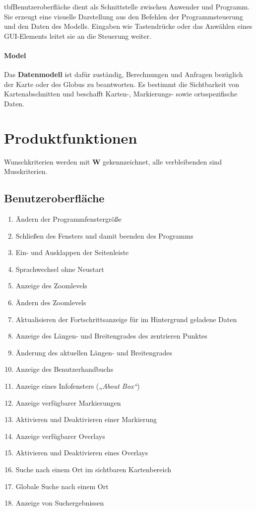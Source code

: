 \documentclass[10pt]{scrreprt}
\newcommand{\sfbf}[1]{\textbf{\sffamily #1}}
\newcommand{\W}{\sfbf{W}}
\newcommand{\ziel}[1]{{\fontsize{9.5}{11}\textsf{/#1/}}}
\newcommand{\ziellabel}{Z}
\newcommand{\muss}{\renewcommand{\labelenumi}{\textbf{\ziel{\ziellabel\numprint{\theenumi}0}}}}
\newcommand{\wunsch}{\renewcommand{\labelenumi}{\textbf{\ziel{\ziellabel\numprint{\theenumi}0W}}}}
\begin{document}
tbf{Benutzeroberfläche} dient als Schnittstelle zwischen Anwender und Programm. Sie erzeugt eine visuelle Darstellung aus den Befehlen der Programmsteuerung und den Daten des Modells. Eingaben wie Tastendrücke oder das Anwählen eines GUI-Elements leitet sie an die Steuerung weiter.

\subsubsection*{Model}
Das \textbf{Datenmodell} ist dafür zuständig, Berechnungen und Anfragen bezüglich der Karte oder des Globus zu beantworten. Es bestimmt die Sichtbarkeit von Kartenabschnitten und beschafft Karten-, Markierungs- sowie ortsspezifische Daten.


\chapter{Produktfunktionen}

\muss
\renewcommand{\ziellabel}{F}

Wunschkriterien werden mit {\W } gekennzeichnet, alle verbleibenden sind Musskriterien.

\section{Benutzeroberfläche}
\begin{enumerate}[leftmargin=2.2cm]
\item Ändern der Programmfenstergröße 
\item Schließen des Fensters und damit beenden des Programms
\item Ein- und Ausklappen der Seitenleiste
\item Sprachwechsel ohne Neustart
\item Anzeige des Zoomlevels
\item Ändern des Zoomlevels
\item Aktualisieren der Fortschrittsanzeige für im Hintergrund geladene Daten
\item Anzeige des Längen- und Breitengrades des zentrieren Punktes
\item Änderung des aktuellen Längen- und Breitengrades
\item Anzeige des Benutzerhandbuchs
\item Anzeige eines Infofensters (\textit{„About Box“})
\wunsch
\item Anzeige verfügbarer Markierungen
\item Aktivieren und Deaktivieren einer Markierung
\muss
\item Anzeige verfügbarer Overlays
\item Aktivieren und Deaktivieren eines Overlays
\wunsch
\item Suche nach einem Ort im sichtbaren Kartenbereich
\item Globale Suche nach einem Ort
\item Anzeige von Suchergebnissen
\end{enumerate}
\end{document}
